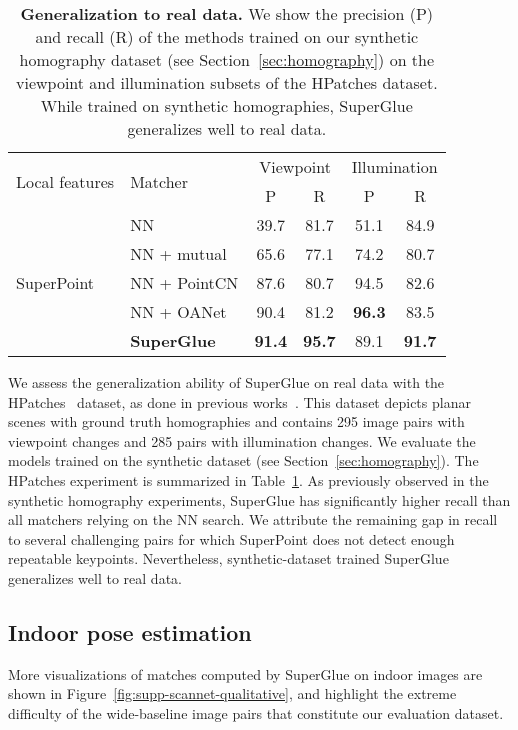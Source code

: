 \documentclass[10pt,twocolumn,letterpaper]{article}
\newcommand{\PAR}[1]{\vskip4pt \noindent{\bf #1~}}
\renewcommand{\*}[1]{\mathbf{#1}}
\renewcommand{\b}[1]{\textbf{#1}}
\newcommand{\0}{\phantom{0}}
\begin{document}
\begin{table}[!h]
\centering
\scriptsize{
\setlength\tabcolsep{3.0pt}
\begin{tabular}{llcccc}
    \toprule
    \multirow{2}{1cm}[-.4em]{Local features} & \multirow{2}{*}[-.4em]{Matcher} &
    \multicolumn{2}{c}{Viewpoint} & \multicolumn{2}{c}{Illumination} \\
    \cmidrule(lr){3-4}\cmidrule(lr){5-6}
    && P & R & P & R\\
    \midrule
    \multirow{5}{*}{SuperPoint}
    & NN & 39.7 & 81.7 & 51.1 & 84.9\\
    & NN + mutual & 65.6 & 77.1 & 74.2 & 80.7\\
    & NN + PointCN & 87.6 & 80.7 & 94.5 & 82.6\\
    & NN + OANet & 90.4 & 81.2 & \b{96.3} & 83.5\\
    & \b{SuperGlue} & \b{91.4} & \b{95.7} & 89.1 & \b{91.7}\\
    \bottomrule
\end{tabular} }
\vspace{-.05in}
\caption{\textbf{Generalization to real data.} We show the precision (P) and recall (R) of the methods trained on our synthetic homography dataset (see Section~\ref{sec:homography}) on the viewpoint and illumination subsets of the HPatches dataset. While trained on synthetic homographies, SuperGlue generalizes well to real data.}
\label{tab:supp-hpatches}
\end{table}

\PAR{HPatches:} We assess the generalization ability of SuperGlue on real data with the HPatches~\cite{balntas2017hpatches} dataset, as done in previous works~\cite{superpoint, revaud2019r2d2}. This dataset depicts planar scenes with ground truth homographies and contains 295 image pairs with viewpoint changes and 285 pairs with illumination changes. We evaluate the models trained on the synthetic dataset (see Section~\ref{sec:homography}). The HPatches experiment is summarized in Table~\ref{tab:supp-hpatches}. As previously observed in the synthetic homography experiments, SuperGlue has significantly higher recall than all matchers relying on the NN search.
We attribute the remaining gap in recall to several challenging pairs for which SuperPoint does not detect enough repeatable keypoints.
Nevertheless, synthetic-dataset trained SuperGlue generalizes well to real data.

\subsection{Indoor pose estimation}
\label{sec:indoor-supp}
\PAR{Qualitative results:} More visualizations of matches computed by SuperGlue on indoor images are shown in Figure~\ref{fig:supp-scannet-qualitative}, and highlight
the extreme difficulty of the wide-baseline image pairs that constitute our evaluation dataset.
\end{document}
